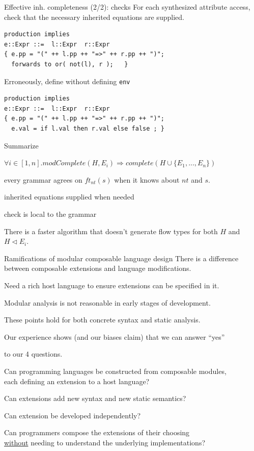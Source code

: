 \documentclass[notes,11pt,aspectratio=169]{beamer}
\begin{document}
\begin{frame}[fragile,t]{Effective inh. completeness (2/2): checks}
For each synthesized attribute access, \\
check that the necessary inherited equations are supplied.

\begin{verbatim}
production implies
e::Expr ::=  l::Expr  r::Expr
{ e.pp = "(" ++ l.pp ++ "=>" ++ r.pp ++ ")";
  forwards to or( not(l), r );   }
\end{verbatim}

\pause
Erroneously, define without defining \texttt{env}

\begin{verbatim}
production implies
e::Expr ::=  l::Expr  r::Expr
{ e.pp = "(" ++ l.pp ++ "=>" ++ r.pp ++ ")";
  e.val = if l.val then r.val else false ; }
\end{verbatim}

\end{frame}


\begin{frame}[t]{Summarize}

$\forall i \in [1,n] . \mathit{modComplete}(H, E_i) 
 \Rightarrow \mathit{complete}( H \cup \{ E_1, ..., E_n \} )$

   \bi
    \x every grammar agrees on $ft_{nt}(s)$ when it knows about $nt$
    and $s$.

    \x inherited equations supplied when needed

    \x check is local to the grammar
   \ei

There is a faster algorithm that doesn't generate flow types for both
$H$ and $H \triangleleft E_i$.
\end{frame}


\begin{frame}[t]{Ramifications of modular composable language design}
\biA
 \x There is a difference between composable extensions and language
    modifications.

\pause
 \bis{0.3cm}
 \x Need a rich host language to ensure extensions can be specified in
    it.

 \x Modular analysis is not reasonable in early stages of development.
 
 \x These points hold for both concrete syntax and static analysis.
 \ei

\pause
 \x Our experience shows (and our biases claim) that we can answer
 ``yes'' 

  to our 4 questions.

\be
\x Can programming languages be constructed from composable modules, \\
   each defining an extension to a host language?

\x Can extensions add new syntax and new static semantics?

\x Can extension be developed independently?

\x Can programmers compose the extensions of their choosing \\
   \underline{without} needing to understand the underlying
   implementations?
\ee
\ei
\end{frame}
\end{document}
